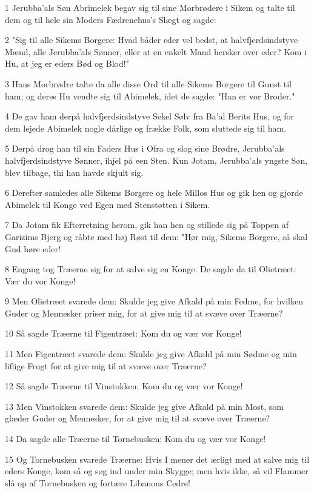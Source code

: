 \par 1 Jerubba'als Søn Abrimelek begav sig til sine Morbrødere i Sikem og talte til dem og til hele sin Moders Fædrenehus's Slægt og sagde:
\par 2 "Sig til alle Sikems Borgere: Hvad båder eder vel bedst, at halvfjerdsindstyve Mænd, alle Jerubba'als Sønner, eller at en enkelt Mand hersker over eder? Kom i Hu, at jeg er eders Bød og Blod!"
\par 3 Hans Morbrødre talte da alle disse Ord til alle Sikems Borgere til Gunst til ham; og deres Hu vendte sig til Abimelek, idet de sagde: "Han er vor Broder."
\par 4 De gav ham derpå halvfjerdsindstyve Sekel Sølv fra Ba'al Berits Hus, og for dem lejede Abimelek nogle dårlige og frække Folk, som sluttede sig til ham.
\par 5 Derpå drog han til sin Faders Hus i Ofra og slog sine Brødre, Jerubba'als halvfjerdsindstyve Sønner, ihjel på een Sten. Kun Jotam, Jerubba'als yngste Søn, blev tilbage, thi han havde skjult sig.
\par 6 Derefter samledes alle Sikems Borgere og hele Millos Hus og gik hen og gjorde Abimelek til Konge ved Egen med Stenstøtten i Sikem.
\par 7 Da Jotam fik Efterretning herom, gik han hen og stillede sig på Toppen af Garizims Bjerg og råbte med høj Røst til dem: "Hør mig, Sikems Borgere, så skal Gud høre eder!
\par 8 Engang tog Træerne sig for at salve sig en Konge. De sagde da til Olietræet: Vær du vor Konge!
\par 9 Men Olietræet svarede dem: Skulde jeg give Afkald på min Fedme, for hvilken Guder og Mennesker priser mig, for at give mig til at svæve over Træerne?
\par 10 Så sagde Træerne til Figentræet: Kom du og vær vor Konge!
\par 11 Men Figentræet svarede dem: Skulde jeg give Afkald på min Sødme og min liflige Frugt for at give mig til at svæve over Træerne?
\par 12 Så sagde Træerne til Vinstokken: Kom du og vær vor Konge!
\par 13 Men Vinstokken svarede dem: Skulde jeg give Afkald på min Most, som glæder Guder og Mennesker, for at give mig til at svæve over Træerne?
\par 14 Da sagde alle Træerne til Tornebusken: Kom du og vær vor Konge!
\par 15 Og Tornebusken svarede Træerne: Hvis I mener det ærligt med at salve mig til eders Konge, kom så og søg ind under min Skygge; men hvis ikke, så vil Flammer slå op af Tornebusken og fortære Libanons Cedre!
